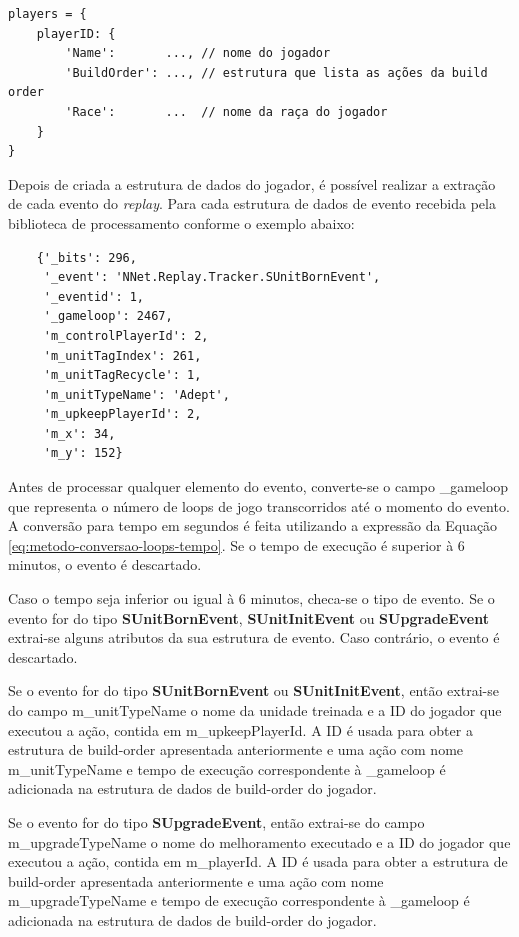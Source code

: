 \begin{lstlisting}
players = {
	playerID: {
		'Name':       ..., // nome do jogador
		'BuildOrder': ..., // estrutura que lista as ações da build order
		'Race':       ...  // nome da raça do jogador
	}
}
\end{lstlisting}

Depois de criada a estrutura de dados do jogador, é possível realizar a extração de cada evento do \textit{\gls{replay}}. Para cada estrutura de dados de evento recebida pela biblioteca de processamento conforme o exemplo abaixo:

\begin{lstlisting}
	{'_bits': 296,
	 '_event': 'NNet.Replay.Tracker.SUnitBornEvent',
	 '_eventid': 1,
	 '_gameloop': 2467,
	 'm_controlPlayerId': 2,
	 'm_unitTagIndex': 261,
	 'm_unitTagRecycle': 1,
	 'm_unitTypeName': 'Adept',
	 'm_upkeepPlayerId': 2,
	 'm_x': 34,
	 'm_y': 152}
\end{lstlisting}

Antes de processar qualquer elemento do evento, converte-se o campo \_gameloop que representa o número de loops de jogo transcorridos até o momento do evento. A conversão para tempo em segundos é feita utilizando a expressão da Equação \ref{eq:metodo-conversao-loops-tempo}. Se o tempo de execução é superior à 6 minutos, o evento é descartado.

Caso o tempo seja inferior ou igual à 6 minutos, checa-se o tipo de evento. Se o evento for do tipo \textbf{SUnitBornEvent}, \textbf{SUnitInitEvent} ou \textbf{SUpgradeEvent} extrai-se alguns atributos da sua estrutura de evento. Caso contrário, o evento é descartado.

Se o evento for do tipo \textbf{SUnitBornEvent} ou \textbf{SUnitInitEvent}, então extrai-se do campo m\_unitTypeName o nome da \gls{unidade} treinada e a ID do jogador que executou a ação, contida em m\_upkeepPlayerId. A ID é usada para obter a estrutura de \gls{build-order} apresentada anteriormente e uma ação com nome m\_unitTypeName e tempo de execução correspondente à \_gameloop é adicionada na estrutura de dados de \gls{build-order} do jogador.

Se o evento for do tipo \textbf{SUpgradeEvent}, então extrai-se do campo m\_upgradeTypeName o nome do \gls{melhoramento} executado e a ID do jogador que executou a ação, contida em m\_playerId. A ID é usada para obter a estrutura de \gls{build-order} apresentada anteriormente e uma ação com nome m\_upgradeTypeName e tempo de execução correspondente à \_gameloop é adicionada na estrutura de dados de \gls{build-order} do jogador.

